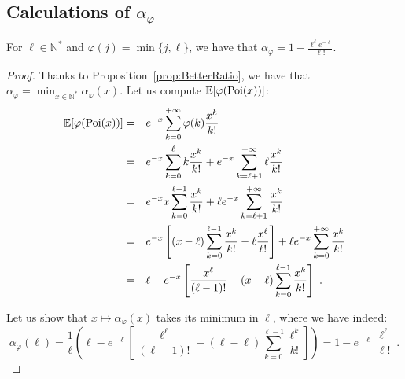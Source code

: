 \subsection{Calculations of $\alpha_{\varphi}$}
\begin{proposition}
  For $\ell \in \mathbb{N}^*$ and $\varphi(j) = \min\{j,\ell\}$, we have that $\alpha_{\varphi}=1-\frac{\ell^{\ell}e^{-\ell}}{\ell!}$.
  \label{prop:lCover}
\end{proposition}
\begin{proof}
  Thanks to Proposition~\ref{prop:BetterRatio}, we have that $\alpha_{\varphi} = \min_{x \in \mathbb{N}^*} \alpha_{\varphi}(x)$. Let us compute $\mathbb{E}[\varphi(\operatorname{\text{Poi}}(x))]$:
  \begin{equation}
    \begin{aligned}
      \mathbb{E}[\varphi(\operatorname{\text{Poi}}(x))] &=&& e^{-x}\sum_{k=0}^{+\infty}\varphi(k)\frac{x^k}{k!}\\
      &=&& e^{-x}\sum_{k=0}^{\ell}k\frac{x^k}{k!} + e^{-x}\sum_{k=\ell+1}^{+\infty}\ell\frac{x^k}{k!}\\
      &=&& e^{-x}x \sum_{k=0}^{\ell-1}\frac{x^k}{k!} + \ell e^{-x}\sum_{k=\ell+1}^{+\infty}\frac{x^k}{k!}\\
      &=&& e^{-x}\left[(x-\ell)\sum_{k=0}^{\ell-1}\frac{x^k}{k!} - \ell\frac{x^{\ell}}{\ell!}\right] + \ell e^{-x}\sum_{k=0}^{+\infty}\frac{x^k}{k!}\\
      &=&& \ell - e^{-x}\left[\frac{x^{\ell}}{(\ell-1)!} - (x-\ell)\sum_{k=0}^{\ell-1}\frac{x^k}{k!}\right] \ .
    \end{aligned}
  \end{equation}

  Let us show that $x \mapsto \alpha_{\varphi}(x)$ takes its minimum in $\ell$, where we have indeed:
  \[ \alpha_{\varphi}(\ell) = \frac{1}{\ell}\left( \ell - e^{-\ell}\left[\frac{\ell^{\ell}}{(\ell-1)!} - (\ell-\ell)\sum_{k=0}^{\ell-1}\frac{\ell^k}{k!}\right]\right) = 1 - e^{-\ell}\frac{\ell^{\ell}}{\ell!} \ . \]


\end{proof}
